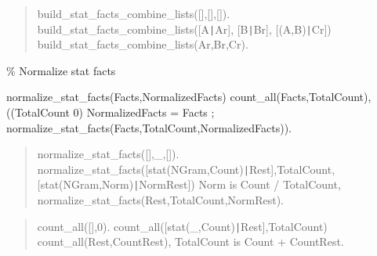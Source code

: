 \begin{quote}
build_stat_facts_combine_lists([],[],[]).
build_stat_facts_combine_lists([A{\tt\string|}Ar], [B{\tt\string|}Br], [(A,B){\tt\string|}Cr]) \Sneck{}
build_stat_facts_combine_lists(Ar,Br,Cr).
\end{quote}

\% Normalize stat facts

\begin{center}
normalize_stat_facts(Facts,NormalizedFacts) \Sneck{}
count_all(Facts,TotalCount),
((TotalCount \Sequal{} 0) \Sifthen{}
NormalizedFacts = Facts
;
normalize_stat_facts(Facts,TotalCount,NormalizedFacts)).
\end{center}

\begin{quote}
normalize_stat_facts([],_,[]).
normalize_stat_facts([stat(NGram,Count){\tt\string|}Rest],TotalCount,[stat(NGram,Norm){\tt\string|}NormRest]) \Sneck{}
Norm is Count / TotalCount,
normalize_stat_facts(Rest,TotalCount,NormRest).
\end{quote}

\begin{quote}
count_all([],0).
count_all([stat(_,Count){\tt\string|}Rest],TotalCount) \Sneck{}
count_all(Rest,CountRest),
TotalCount is Count + CountRest.
\end{quote}

